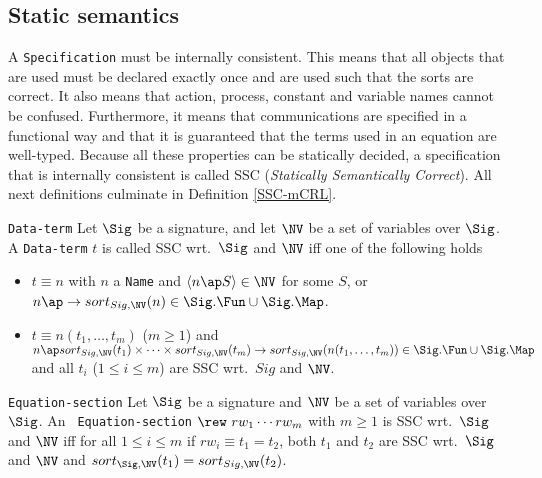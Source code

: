 \documentclass[twoside,fleqn,a4paper,dvips]{article}
\begin{document}
\subsection{Static semantics}
A {\tt Specification} must be internally consistent. This means
that all objects that are used must be declared exactly once and 
are used such that the sorts are correct. It also means that action,
process, constant and variable names cannot be confused.
Furthermore, it means that communications are specified in a functional
way and that it is guaranteed that the terms used in an equation are well-typed.
Because all these properties can be statically decided, a
specification that is internally consistent is called SSC
({\em Statically Semantically Correct}). All next definitions
culminate in Definition \ref{SSC-mCRL}.

\begin{Dn-arg}{{\tt Data-term}}
Let $\Sig$ be a signature, and let $\NV$ be a set of variables over
$\Sig$.
A {\tt Data-term} $t$ is called SSC wrt.\ $\Sig$ and $\NV$ iff one of
the following holds
\begin{itemize}
\item
$t\equiv n$ with $n$ a {\tt Name} and
$\langle n\ap S\rangle\in \NV$ for some $S$, or
$n\ap  \rightarrow sort_{Sig,\NV}(n)\in \Sig.\Fun\cup\Sig.\Map$.
\item
$t\equiv n(t_1,\ldots,t_m)$ ($m\geq 1$) and
$n\ap sort_{Sig,\NV}(t_1)\times\cdots\times sort_{Sig,\NV}(t_m)
\rightarrow sort_{Sig,\NV}(n(t_1,\ldots,t_m))\in \Sig.\Fun\cup\Sig.\Map$ and
all
$t_i$ ($1\leq i\leq m$) are SSC wrt.\ $Sig$ and $\NV$.
\end{itemize}
\end{Dn-arg}

\begin{Dn-arg}{{\tt Equation-section}}
Let $\Sig$ be a signature and $\NV$ be a set of variables over $\Sig$. An {\tt
Equation-section}
$\rew~rw_1\cdots rw_m$
with $m\geq 1$ is SSC wrt.\ $\Sig$ and $\NV$ iff for all
$1\leq i\leq m $ if $rw_i\equiv t_1=t_2$,
both $t_1$ and $t_2$ are SSC wrt.\ $\Sig$ and $\NV$ and
$sort_{\Sig,\NV}(t_1)=sort_{Sig,\NV}(t_2)$.
\end{Dn-arg}
\end{document}
